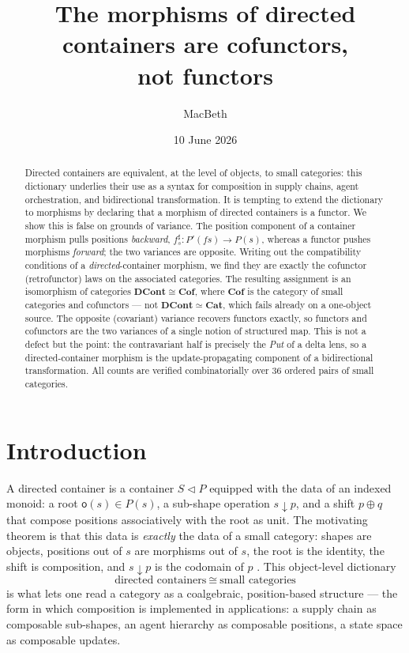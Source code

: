 \documentclass[11pt,a4paper]{amsart}
\title[The morphisms of directed containers are cofunctors]{The morphisms of directed containers are cofunctors,\\ not functors}
\author{MacBeth}
\date{10 June 2026}
\newcommand{\Cat}{\mathbf{Cat}}
\newcommand{\Cof}{\mathbf{Cof}}
\newcommand{\DCont}{\mathbf{DCont}}
\newcommand{\cont}[2]{#1 \triangleleft #2}
\theoremstyle{plain}
\theoremstyle{definition}
\theoremstyle{remark}
\begin{document}
\begin{abstract}
Directed containers are equivalent, at the level of objects, to small categories:
this dictionary underlies their use as a syntax for composition in supply chains,
agent orchestration, and bidirectional transformation. It is tempting to extend the
dictionary to morphisms by declaring that a morphism of directed containers is a
functor. We show this is false on grounds of variance. The position component of a
container morphism pulls positions \emph{backward}, $f^\sharp_s\colon P'(fs)\to P(s)$,
whereas a functor pushes morphisms \emph{forward}; the two variances are opposite.
Writing out the compatibility conditions of a \emph{directed}-container morphism, we
find they are exactly the cofunctor (retrofunctor) laws on the associated categories.
The resulting assignment is an isomorphism of categories $\DCont\cong\Cof$, where
$\Cof$ is the category of small categories and cofunctors --- not $\DCont\simeq\Cat$,
which fails already on a one-object source. The opposite (covariant) variance recovers
functors exactly, so functors and cofunctors are the two variances of a single notion
of structured map. This is not a defect but the point: the contravariant half is
precisely the \emph{Put} of a delta lens, so a directed-container morphism is the
update-propagating component of a bidirectional transformation. All counts are
verified combinatorially over $36$ ordered pairs of small categories.
\end{abstract}

\maketitle

\section{Introduction}

A directed container \cite{ACU14,AU16} is a container $\cont SP$ equipped with the
data of an indexed monoid: a root $\mathsf o(s)\in P(s)$, a sub-shape operation
$s\downarrow p$, and a shift $p\oplus q$ that compose positions associatively with the
root as unit. The motivating theorem is that this data is \emph{exactly} the data of a
small category: shapes are objects, positions out of $s$ are morphisms out of $s$, the
root is the identity, the shift is composition, and $s\downarrow p$ is the codomain
of $p$ \cite{AU16}. This object-level dictionary
\[
  \text{directed containers}\ \cong\ \text{small categories}
\]
is what lets one read a category as a coalgebraic, position-based structure --- the
form in which composition is implemented in applications: a supply chain as composable
sub-shapes, an agent hierarchy as composable positions, a state space as composable
updates.
\end{document}
